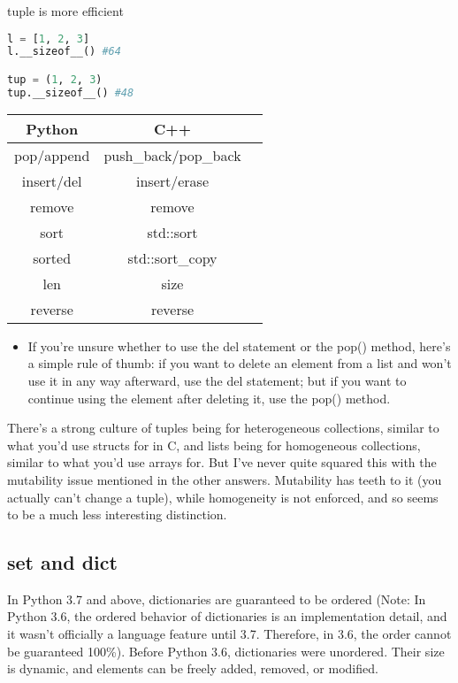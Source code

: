 \documentclass[a4paper,12pt,twoside]{book}
\begin{document}
tuple is more efficient 
\begin{lstlisting}[frame=single, language=Python]
l = [1, 2, 3]
l.__sizeof__() #64

tup = (1, 2, 3)
tup.__sizeof__() #48
\end{lstlisting}  

\begin{tabular}{|c|c|c|}
	\hline
Python	& C++  &  \\
	\hline
pop/append	& push\_back/pop\_back  &  \\
	\hline
insert/del	& insert/erase &  \\
	\hline
remove	& remove &  \\
	\hline
sort & std::sort  &  \\
	\hline
sorted	& std::sort\_copy &  \\
	\hline
len	& size &  \\
\hline
reverse	& reverse &  \\
\hline
\end{tabular}
 
\begin{itemize}
	\item If you're unsure whether to use the del statement or the pop() method, here's a simple rule of thumb: if you want to delete an element from a list and won't use it in any way afterward, use the del statement; but if you want to continue using the element after deleting it, use the pop() method.
\end{itemize}


There's a strong culture of tuples being for heterogeneous collections, similar to what you'd use structs for in C, and lists being for homogeneous collections, similar to what you'd use arrays for. But I've never quite squared this with the mutability issue mentioned in the other answers. Mutability has teeth to it (you actually can't change a tuple), while homogeneity is not enforced, and so seems to be a much less interesting distinction.

\subsection{set and dict}

In Python 3.7 and above, dictionaries are guaranteed to be ordered (Note: In Python 3.6, the ordered behavior of dictionaries is an implementation detail, and it wasn’t officially a language feature until 3.7. Therefore, in 3.6, the order cannot be guaranteed 100\%). Before Python 3.6, dictionaries were unordered. Their size is dynamic, and elements can be freely added, removed, or modified.
\end{document}
